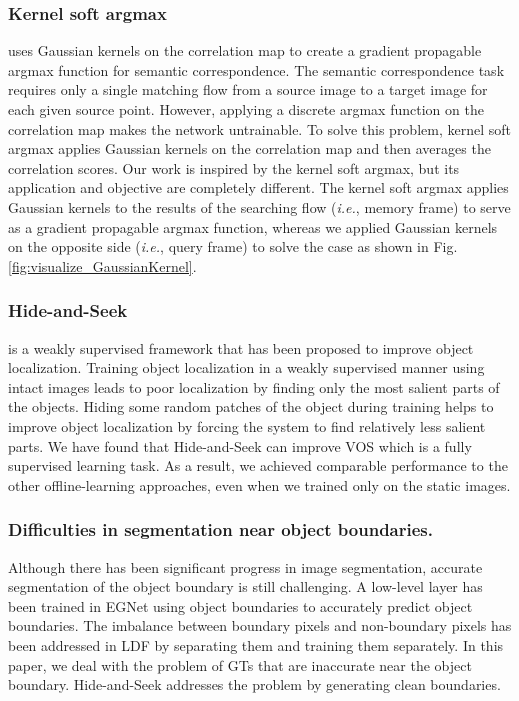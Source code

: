 \documentclass[runningheads]{llncs}
\begin{document}
\subsubsection{Kernel soft argmax}\cite{lee2019sfnet} uses Gaussian kernels on the correlation map to create a gradient propagable argmax function for semantic correspondence. The semantic correspondence task requires only a single matching flow from a source image to a target image for each given source point. However, applying a discrete argmax function on the correlation map makes the network untrainable. To solve this problem, kernel soft argmax applies Gaussian kernels on the correlation map and then averages the correlation scores. Our work is inspired by the kernel soft argmax, but its application and objective are completely different. The kernel soft argmax applies Gaussian kernels to the results of the searching flow (\textit{i.e.}, memory frame) to serve as a gradient propagable argmax function, whereas we applied Gaussian kernels on the opposite side (\textit{i.e.}, query frame) to solve the case as shown in Fig. \ref{fig:visualize_GaussianKernel}.

\subsubsection{Hide-and-Seek}\cite{singh2017hide} is a weakly supervised framework that has been proposed to improve object localization. Training object localization in a weakly supervised manner using intact images leads to poor localization by finding only the most salient parts of the objects. Hiding some random patches of the object during training helps to improve object localization by forcing the system to find relatively less salient parts. We have found that Hide-and-Seek can improve VOS which is a fully supervised learning task. As a result, we achieved comparable performance to the other offline-learning approaches, even when we trained only on the static images.



\subsubsection{Difficulties in segmentation near object boundaries.} 
Although there has been significant progress in image segmentation, accurate segmentation of the object boundary is still challenging. A low-level layer has been trained in EGNet \cite{zhao2019egnet} using object boundaries to accurately predict object boundaries. The imbalance between boundary pixels and non-boundary pixels has been addressed in LDF \cite{wei2020label} by separating them and training them separately. In this paper, we deal with the problem of GTs that are inaccurate near the object boundary. Hide-and-Seek addresses the problem by generating clean boundaries.
\end{document}
